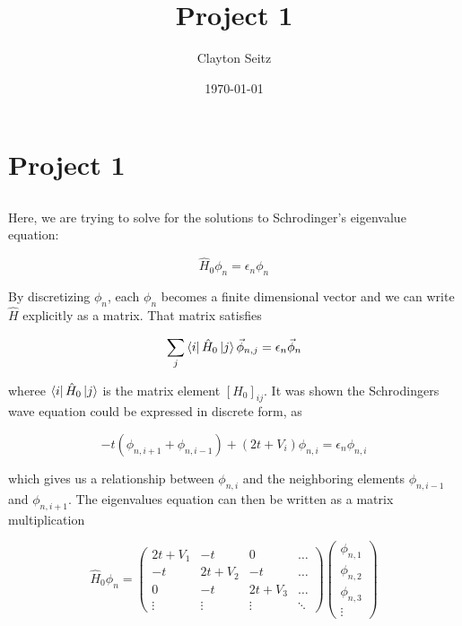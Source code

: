 \documentclass[%
 reprint,
 amsmath,amssymb,
 aps,
]{revtex4-2}
\begin{document}
\title{Project 1}%

\author{Clayton Seitz}

\date{\today}%


\maketitle


\section{Project 1}

\subsection{}


Here, we are trying to solve for the solutions to Schrodinger's eigenvalue equation:

\begin{equation*}
\hat{H}_{0}\phi_{n} = \epsilon_{n}\phi_{n}
\end{equation*}

By discretizing $\phi_{n}$, each $\phi_{n}$ becomes a finite dimensional vector and we can write $\hat{H}$ explicitly as a matrix. That matrix satisfies

\begin{equation*}
\sum_{j}\bra{i}\hat{H}_{0}\ket{j}\vec{\phi}_{n,j} = \epsilon_{n}\vec{\phi}_{n}
\end{equation*}

wheree $\bra{i}\hat{H}_{0}\ket{j}$ is the matrix element $[H_{0}]_{ij}$. It was shown the Schrodingers wave equation could be expressed in discrete form, as

\begin{equation*}
-t(\phi_{n,i+1} + \phi_{n,i-1}) + (2t+V_{i})\phi_{n,i} = \epsilon_{n}\phi_{n,i}
\end{equation*}

which gives us a relationship between $\phi_{n,i}$ and the neighboring elements $\phi_{n,i-1}$ and $\phi_{n,i+1}$. The eigenvalues equation can then be written as a matrix multiplication

\begin{equation}
\hat{H}_{0}\phi_{n} = \begin{pmatrix}
2t + V_{1} & -t & 0 & \hdots\\
-t & 2t + V_{2} & -t& \hdots\\
0 & -t & 2t + V_{3}& \hdots\\
\vdots & \vdots & \vdots & \ddots
\end{pmatrix}
\begin{pmatrix}
\phi_{n,1}\\
\phi_{n,2}\\
\phi_{n,3}\\
\vdots
\end{pmatrix}
\end{equation}
\end{document}

